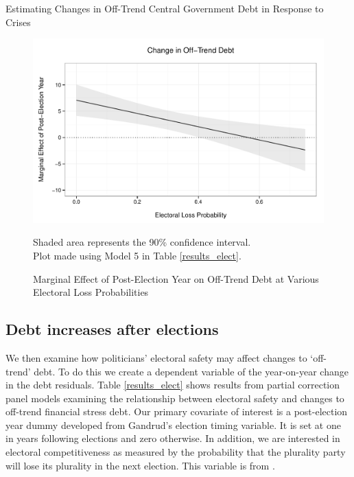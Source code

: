 \documentclass[]{article}
\begin{document}
\begin{table}
    \caption{Estimating Changes in Off-Trend Central Government Debt in Response to Crises}
    \label{results_elect}
    \begin{center}
        
    \end{center}
\end{table}

\begin{figure}
    \caption{Marginal Effect of Post-Election Year on Off-Trend Debt at Various Electoral Loss Probabilities}
    \label{post_loss_me}

    \begin{center}
        \includegraphics[scale=0.55]{figures/post_elect_loss.pdf}
    \end{center}

    {\scriptsize{Shaded area represents the 90\% confidence interval. \\
    Plot made using Model 5 in Table \ref{results_elect}.}}

\end{figure}

\subsection{Debt increases after elections}

We then examine how politicians' electoral safety may affect changes to `off-trend' debt. To do this we create a dependent variable of the year-on-year change in the debt residuals. Table \ref{results_elect} shows results from partial correction panel models examining the relationship between electoral safety and changes to off-trend financial stress debt. Our primary covariate of interest is a post-election year dummy developed from Gandrud's \citeyearpar{gandrudYrcurnt} election timing variable. It is set at one in years following elections and zero otherwise. In addition, we are interested in electoral competitiveness as measured by the probability that the plurality party will lose its plurality in the next election. This variable is from \cite{Kayser2015comp}.
\end{document}
